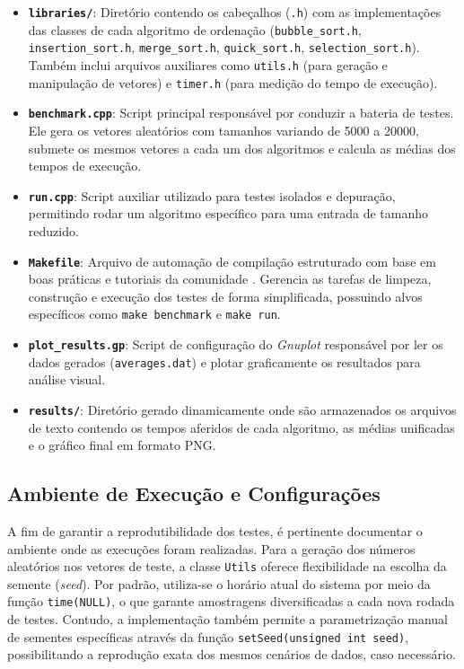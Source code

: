 \documentclass[
	article,			%
	11pt,				%
	oneside,			%
	a4paper,			%
	english,			%
	brazil,				%
	sumario=tradicional
	]{abntex2}
\begin{document}
\begin{itemize}
    \item \textbf{\texttt{libraries/}}: Diretório contendo os cabeçalhos (\texttt{.h}) com as implementações das classes de cada algoritmo de ordenação (\texttt{bubble\_sort.h}, \texttt{insertion\_sort.h}, \texttt{merge\_sort.h}, \texttt{quick\_sort.h}, \texttt{selection\_sort.h}). Também inclui arquivos auxiliares como \texttt{utils.h} (para geração e manipulação de vetores) e \texttt{timer.h} (para medição do tempo de execução).
    \item \textbf{\texttt{benchmark.cpp}}: Script principal responsável por conduzir a bateria de testes. Ele gera os vetores aleatórios com tamanhos variando de 5000 a 20000, submete os mesmos vetores a cada um dos algoritmos e calcula as médias dos tempos de execução.
    \item \textbf{\texttt{run.cpp}}: Script auxiliar utilizado para testes isolados e depuração, permitindo rodar um algoritmo específico para uma entrada de tamanho reduzido.
    \item \textbf{\texttt{Makefile}}: Arquivo de automação de compilação estruturado com base em boas práticas e tutoriais da comunidade \cite{prof_eletrico_makefile, gist_makefile, so_makefile}. Gerencia as tarefas de limpeza, construção e execução dos testes de forma simplificada, possuindo alvos específicos como \texttt{make benchmark} e \texttt{make run}.
    \item \textbf{\texttt{plot\_results.gp}}: Script de configuração do \textit{Gnuplot} responsável por ler os dados gerados (\texttt{averages.dat}) e plotar graficamente os resultados para análise visual.
    \item \textbf{\texttt{results/}}: Diretório gerado dinamicamente onde são armazenados os arquivos de texto contendo os tempos aferidos de cada algoritmo, as médias unificadas e o gráfico final em formato PNG.
\end{itemize}

\subsection{Ambiente de Execução e Configurações}

A fim de garantir a reprodutibilidade dos testes, é pertinente documentar o ambiente onde as execuções foram realizadas. Para a geração dos números aleatórios nos vetores de teste, a classe \texttt{Utils} oferece flexibilidade na escolha da semente (\textit{seed}). Por padrão, utiliza-se o horário atual do sistema por meio da função \texttt{time(NULL)}, o que garante amostragens diversificadas a cada nova rodada de testes. Contudo, a implementação também permite a parametrização manual de sementes específicas através da função \texttt{setSeed(unsigned int seed)}, possibilitando a reprodução exata dos mesmos cenários de dados, caso necessário.
\end{document}
